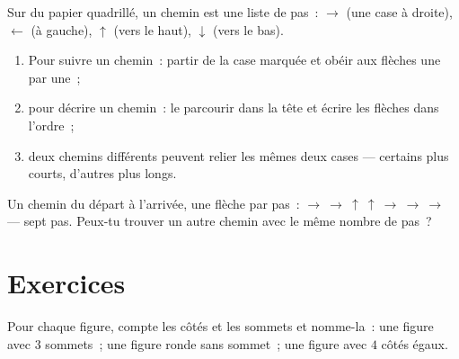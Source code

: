 \begin{method}\label{met:g1:shapes:path}
Sur du papier quadrillé, un chemin est une liste de pas~:
$\to$ (une case à droite), $\leftarrow$ (à gauche), $\uparrow$
(vers le haut), $\downarrow$ (vers le bas).
\begin{enumerate}
  \item Pour suivre un chemin~: partir de la case marquée et obéir
        aux flèches une par une~;
  \item pour décrire un chemin~: le parcourir dans la tête et
        écrire les flèches dans l'ordre~;
  \item deux chemins différents peuvent relier les mêmes deux
        cases --- certains plus courts, d'autres plus longs.
\end{enumerate}
\end{method}

\begin{omfigure}

{\small Un chemin du départ à l'arrivée, une flèche par pas~:
$\to\ \to\ \uparrow\ \uparrow\ \to\ \to\ \to$ --- sept pas. Peux-tu
trouver un autre chemin avec le même nombre de pas~?}
\end{omfigure}

\section{Exercices}

\begin{exercise}[$\star$]\label{exo:g1:shapes:1}
Pour chaque figure, compte les côtés et les sommets et nomme-la~:
une figure avec $3$ sommets~; une figure ronde sans sommet~; une
figure avec $4$ côtés égaux.
\end{exercise}

